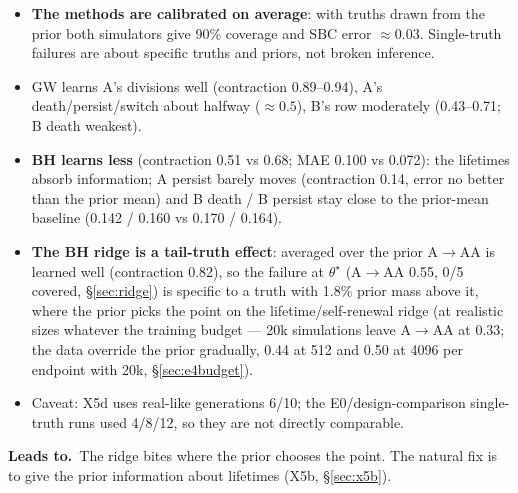 \documentclass[10pt,a4paper]{article}
\newcommand{\blk}[1]{\par\needspace{5\baselineskip}\smallskip{\sffamily\bfseries\color{inkgray}#1}\par}
\newcommand{\Comment}{\blk{Comment}}
\newcommand{\Leads}[1]{\begin{leadbox}{\sffamily\bfseries\color{caqua!70!black}Leads to.}\ #1\end{leadbox}}
\renewcommand{\blk}[1]{\par\Needspace*{5\baselineskip}\smallskip{\sffamily\bfseries\color{inkgray}#1}\par}
\newcommand{\sref}[1]{\S\ref{#1}}
\begin{document}
\Comment
\begin{itemize}
\item \textbf{The methods are calibrated on average}: with truths drawn from the prior both simulators give 90\% coverage and SBC error $\approx 0.03$. Single-truth failures are about specific truths and priors, not broken inference.
\item GW learns A's divisions well (contraction 0.89--0.94), A's death/persist/switch about halfway ($\approx 0.5$), B's row moderately (0.43--0.71; B death weakest).
\item \textbf{BH learns less} (contraction 0.51 vs 0.68; MAE 0.100 vs 0.072): the lifetimes absorb information; A persist barely moves (contraction 0.14, error no better than the prior mean) and B death / B persist stay close to the prior-mean baseline (0.142 / 0.160 vs 0.170 / 0.164).
\item \textbf{The BH ridge is a tail-truth effect}: averaged over the prior A$\to$AA is learned well (contraction 0.82), so the failure at $\theta^\star$ (A$\to$AA 0.55, 0/5 covered, \S\ref{sec:ridge}) is specific to a truth with 1.8\% prior mass above it, where the prior picks the point on the lifetime/self-renewal ridge (at realistic sizes whatever the training budget --- 20k simulations leave A$\to$AA at 0.33; the data override the prior gradually, 0.44 at 512 and 0.50 at 4096 per endpoint with 20k, \sref{sec:e4budget}).
\item Caveat: X5d uses real-like generations 6/10; the E0/design-comparison single-truth runs used 4/8/12, so they are not directly comparable.
\end{itemize}
\Leads{The ridge bites where the prior chooses the point. The natural fix is to give the prior information about lifetimes (X5b, \sref{sec:x5b}).}
\end{document}
